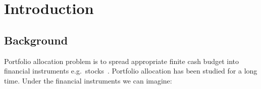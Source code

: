 

\chapter{Introduction}\label{ch:introduction}


\section{Background}\label{sec:background}
Portfolio allocation problem is to spread appropriate finite cash budget into financial instruments e.g.\ stocks~\cite{Model-Free-Reinforcement-Learning-for-Asset-Allocation}.
Portfolio allocation has been studied for a long time.
Under the financial instruments we can imagine:
